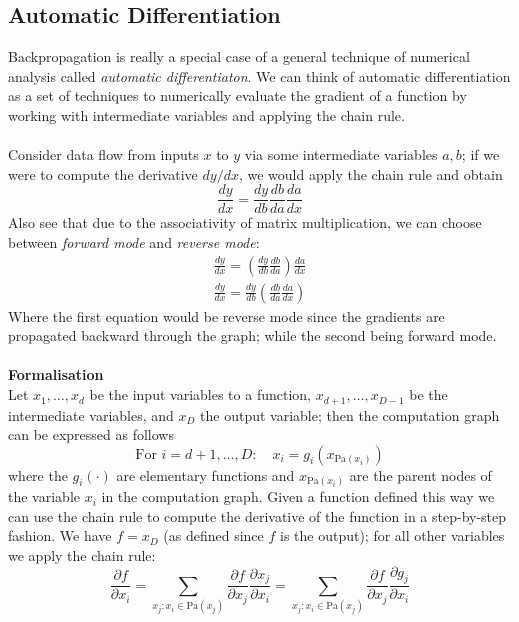\documentclass{report}
\begin{document}
\subsection{Automatic Differentiation}
Backpropagation is really a special case of a general technique of numerical analysis called 
\textit{automatic differentiaton}. We can think of automatic
differentiation as a set of techniques to numerically evaluate the gradient of a function by working with intermediate
variables and applying the chain rule.\\
\vspace{1mm}\\
Consider data flow from inputs $x$ to $y$ via some intermediate variables $a,b$; if we were to compute the derivative $dy/dx$,
we would apply the chain rule and obtain
\begin{equation*}
\frac{dy}{dx}=\frac{dy}{db}\frac{db}{da}\frac{da}{dx}
\end{equation*}
Also see that due to the associativity of matrix multiplication, we can choose between \textit{forward mode} and
\textit{reverse mode}:
\begin{align*}
\frac{dy}{dx}=\left(\frac{dy}{db}\frac{db}{da}\right)\frac{da}{dx}\\
\frac{dy}{dx}=\frac{dy}{db}\left(\frac{db}{da}\frac{da}{dx}\right)
\end{align*}
Where the first equation would be reverse mode since the gradients are propagated backward through the graph; while the 
second being forward mode.\\
\vspace{1mm}\\
\textbf{Formalisation}\\
Let $x_1,\ldots,x_d$ be the input variables to a function, 
$x_{d+1},\ldots,x_{D-1}$ be the intermediate variables, and 
$x_D$ the output variable; then the computation graph can be 
expressed as follows
\begin{equation*}
\text{For }i=d+1,\ldots,D:\quad x_i=g_i(x_{\text{Pa}(x_i)})
\end{equation*}
where the $g_i(\cdot)$ are elementary functions and $x_{\text{Pa}(x_i)}$ are the parent nodes of the variable $x_i$ in 
the computation graph. Given a function defined this way
we can use the chain rule to compute the derivative of the function in a step-by-step fashion.
We have $f=x_D$ (as defined since $f$ is the output); for all other variables we apply the chain rule:
\begin{equation*}
\frac{\partial f}{\partial x_i}=\sum_{x_j:x_i\in\text{Pa}(x_j)}
\frac{\partial f}{\partial x_j}\frac{\partial x_j}{\partial x_i}=
\sum_{x_j:x_i\in\text{Pa}(x_j)}
\frac{\partial f}{\partial x_j}\frac{\partial g_j}{\partial x_i}
\end{equation*}
\end{document}

